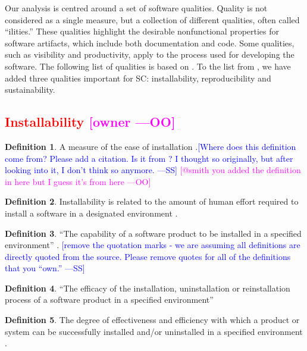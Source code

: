 \documentclass[letterpaper,cleveref]{lipics-v2019}
\newcommand{\authornote}[3]{\textcolor{#1}{[#3 ---#2]}}
\newcommand{\authornote}[3]{}
\newcommand{\wss}[1]{\authornote{blue}{SS}{#1}} %
\newcommand{\oo}[1]{\authornote{magenta}{OO}{#1}} %
\newcommand{\notdone}[1]{\textcolor{red}{#1}}
\theoremstyle{definition}
\newtheorem{defn}{Definition}
\begin{document}
Our analysis is centred around a set of software qualities.  Quality is not
considered as a single measure, but a collection of different qualities, often
called ``ilities.''  These qualities highlight the desirable nonfunctional
properties for software artifacts, which include both documentation and
code. Some qualities, such as visibility and productivity, apply to the process
used for developing the software. The following list of qualities is based on
\cite{GhezziEtAl2003}. To the list from \cite{GhezziEtAl2003}, we have added
three qualities important for SC: installability, reproducibility and
sustainability.

\subsection{\notdone{Installability} \oo{owner}}

\begin{defn}
  A measure of the ease of installation \citep{smith2015comparing}.\wss{Where does this definition come
    from? Please add a citation.  Is it from \citet{McCallEtAl1977}?  I thought
    so originally, but after looking into it, I don't think so anymore.}
   \oo{@smith you added the definition in here but I guess it's from here}
\end{defn}

\begin{defn}
  Installability is related to the amount of human effort required to install a
  software in a designated environment \citep{berander2005software}.
\end{defn}

\begin{defn}
  ``The capability of a software product to be installed in a specified
  environment'' \citep{berander2005software}.  \wss{remove the quotation marks -
    we are assuming all definitions are directly quoted from the source.  Please
  remove quotes for all of the definitions that you ``own.''}

\end{defn}

\begin{defn} \label{InstallabilityDefnSelected1}
  ``The efficacy of the installation, uninstallation or reinstallation process
  of a software product in a specified environment'' \citep{iso201017043}
\end{defn}

\begin{defn}
 The degree of effectiveness and efficiency with which a product or system can be successfully installed and/or uninstalled in a specified environment \citep{ISO/IEC25010}.
\end{defn}
\end{document}
